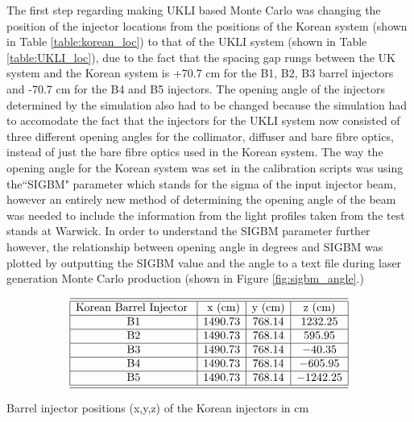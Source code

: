 The first step regarding making UKLI based Monte Carlo was changing the position of the injector locations from the positions of the Korean system (shown in Table \ref{table:korean_loc}) to that of the UKLI system (shown in Table \ref{table:UKLI_loc}), due to the fact that the spacing gap rungs between the UK system and the Korean system is +70.7 cm for the B1, B2, B3 barrel injectors and -70.7 cm for the B4 and B5 injectors. The opening angle of the injectors determined by the simulation also had to be changed because the simulation had to accomodate the fact that the injectors for the UKLI system now consisted of three different opening angles for the collimator, diffuser and bare fibre optics, instead of just the bare fibre optics used in the Korean system. The way the opening angle for the Korean system was set in the calibration scripts was using the``SIGBM" parameter which stands for the sigma of the input injector beam, however an entirely new method of determining the opening angle of the beam was needed to include the information from the light profiles taken from the test stands at Warwick. In order to understand the SIGBM parameter further however, the relationship between opening angle in degrees and SIGBM was plotted by outputting the SIGBM value and the angle to a text file during laser generation Monte Carlo production (shown in Figure \ref{fig:sigbm_angle}.)

\begin{table}[htp]
    $$
\begin{array}{|c|c|c|c|c|c|}  
    \hline \hline{\text {Korean Barrel Injector }} & {\text { x (cm)}} & {\text {y (cm)}} & {\text {z (cm)}}  \tabularnewline
    \hline \text { B1 } & 1490.73 & 768.14 & 1232.25 \\
    \hline \text { B2 } & 1490.73 & 768.14 & 595.95 \\
    \hline \text { B3 } & 1490.73 & 768.14 & -40.35 \\
    \hline \text { B4 } & 1490.73 & 768.14 & -605.95 \\
    \hline \text { B5 } & 1490.73 & 768.14 &  -1242.25 \\
    \hline \hline 
\end{array}
    $$
\caption{Barrel injector positions (x,y,z) of the Korean injectors in cm} 
\label{table:korean_loc}
\end{table}

